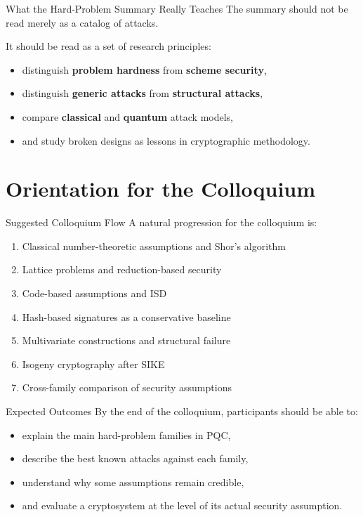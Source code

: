 \documentclass[aspectratio=169]{beamer}
\begin{document}
	\begin{frame}{What the Hard-Problem Summary Really Teaches}
		The summary should not be read merely as a catalog of attacks.
		
		\vspace{0.5em}
		It should be read as a set of research principles:
		\begin{itemize}
			\item distinguish \textbf{problem hardness} from \textbf{scheme security},
			\item distinguish \textbf{generic attacks} from \textbf{structural attacks},
			\item compare \textbf{classical} and \textbf{quantum} attack models,
			\item and study broken designs as lessons in cryptographic methodology.
		\end{itemize}
	\end{frame}
	
	\section{Orientation for the Colloquium}
	
	\begin{frame}{Suggested Colloquium Flow}
		A natural progression for the colloquium is:
		\begin{enumerate}
			\item Classical number-theoretic assumptions and Shor's algorithm
			\item Lattice problems and reduction-based security
			\item Code-based assumptions and ISD
			\item Hash-based signatures as a conservative baseline
			\item Multivariate constructions and structural failure
			\item Isogeny cryptography after SIKE
			\item Cross-family comparison of security assumptions
		\end{enumerate}
	\end{frame}
	
	\begin{frame}{Expected Outcomes}
		By the end of the colloquium, participants should be able to:
		\begin{itemize}
			\item explain the main hard-problem families in PQC,
			\item describe the best known attacks against each family,
			\item understand why some assumptions remain credible,
			\item and evaluate a cryptosystem at the level of its actual security assumption.
		\end{itemize}
	\end{frame}
	
\end{document}
